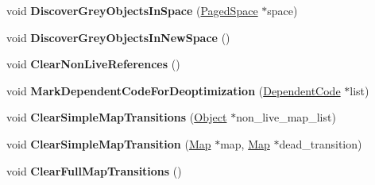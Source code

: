 \begin{DoxyCompactItemize}
\item 
void {\bfseries Discover\+Grey\+Objects\+In\+Space} (\hyperlink{classv8_1_1internal_1_1_paged_space}{Paged\+Space} $\ast$space)\hypertarget{classv8_1_1internal_1_1_mark_compact_collector_a73e26f4641f4013a98d7e156846a012e}{}\label{classv8_1_1internal_1_1_mark_compact_collector_a73e26f4641f4013a98d7e156846a012e}

\item 
void {\bfseries Discover\+Grey\+Objects\+In\+New\+Space} ()\hypertarget{classv8_1_1internal_1_1_mark_compact_collector_a9291446de0a076c869ebb3aa4a756bd6}{}\label{classv8_1_1internal_1_1_mark_compact_collector_a9291446de0a076c869ebb3aa4a756bd6}

\item 
void {\bfseries Clear\+Non\+Live\+References} ()\hypertarget{classv8_1_1internal_1_1_mark_compact_collector_a129119a903f3c2057d4a02d0ed5d0e7e}{}\label{classv8_1_1internal_1_1_mark_compact_collector_a129119a903f3c2057d4a02d0ed5d0e7e}

\item 
void {\bfseries Mark\+Dependent\+Code\+For\+Deoptimization} (\hyperlink{classv8_1_1internal_1_1_dependent_code}{Dependent\+Code} $\ast$list)\hypertarget{classv8_1_1internal_1_1_mark_compact_collector_ad59e8d4e51018f7df3cc2d9caad5a9a3}{}\label{classv8_1_1internal_1_1_mark_compact_collector_ad59e8d4e51018f7df3cc2d9caad5a9a3}

\item 
void {\bfseries Clear\+Simple\+Map\+Transitions} (\hyperlink{classv8_1_1internal_1_1_object}{Object} $\ast$non\+\_\+live\+\_\+map\+\_\+list)\hypertarget{classv8_1_1internal_1_1_mark_compact_collector_a15a0778200f7e91c4d603c7d926b0f28}{}\label{classv8_1_1internal_1_1_mark_compact_collector_a15a0778200f7e91c4d603c7d926b0f28}

\item 
void {\bfseries Clear\+Simple\+Map\+Transition} (\hyperlink{classv8_1_1internal_1_1_map}{Map} $\ast$map, \hyperlink{classv8_1_1internal_1_1_map}{Map} $\ast$dead\+\_\+transition)\hypertarget{classv8_1_1internal_1_1_mark_compact_collector_a3143f443017a04f06aa80ba9f312bbac}{}\label{classv8_1_1internal_1_1_mark_compact_collector_a3143f443017a04f06aa80ba9f312bbac}

\item 
void {\bfseries Clear\+Full\+Map\+Transitions} ()\hypertarget{classv8_1_1internal_1_1_mark_compact_collector_acae633babe09a8fa47c416b37fba6410}{}\label{classv8_1_1internal_1_1_mark_compact_collector_acae633babe09a8fa47c416b37fba6410}


\end{DoxyCompactItemize}
